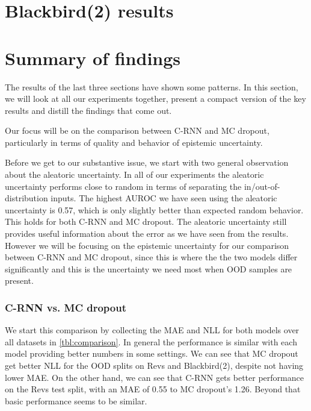 \documentclass[../main.tex]{subfiles}
\begin{document}
\clearpage
\section{Blackbird(2) results}


\clearpage
\section{Summary of findings}

The results of the last three sections have shown some patterns. In this section, we will look at all our experiments together, present a compact version of the key results and distill the findings that come out.

Our focus will be on the comparison between C-RNN and MC dropout, particularly in terms of quality and behavior of epistemic uncertainty. 

Before we get to our substantive issue, we start with two general observation about the aleatoric uncertainty. In all of our experiments the aleatoric uncertainty performs close to random in terms of separating the in/out-of-distribution inputs. The highest AUROC we have seen using the aleatoric uncertainty is 0.57, which is only slightly better than expected random behavior. This holds for both C-RNN and MC dropout. The aleatoric uncertainty still provides useful information about the error as we have seen from the results. However we will be focusing on the epistemic uncertainty for our comparison between C-RNN and MC dropout, since this is where the the two models differ significantly and this is the uncertainty we need most when OOD samples are present.    



\subsubsection{C-RNN vs. MC dropout}

We start this comparison by collecting the MAE and NLL for both models over all datasets in \cref{tbl:comparison}. In general the performance is similar with each model providing better numbers in some settings. We can see that MC dropout get better NLL for the OOD splits on Revs and Blackbird(2), despite not having lower MAE. On the other hand, we can see that C-RNN gets better performance on the Revs test split, with an MAE of 0.55 to MC dropout's 1.26. Beyond that basic performance seems to be similar. 
\end{document}
